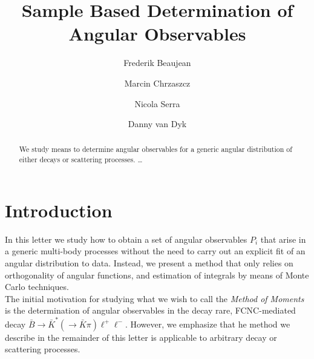 \documentclass[aps,prd,reprint,nofootinbib,preprintnumbers]{revtex4}
\begin{document}
\allowdisplaybreaks

\title{Sample Based Determination of Angular Observables}
\author{Frederik Beaujean}
\author{Marcin Chrzaszcz}
\author{Nicola Serra}
\author{Danny van Dyk}

\begin{abstract}
We study means to determine angular observables for a generic angular distribution
of either decays or scattering processes. \dots
\end{abstract}

\maketitle

\section{Introduction}
\label{sec:intro}

In this letter we study how to obtain a set of angular observables $P_i$
that arise in a generic multi-body processes without the need to carry out
an explicit fit of an angular distribution to data. Instead, we present a method
that only relies on orthogonality of angular functions, and estimation of integrals
by means of Monte Carlo techniques.\\

The initial motivation for studying what we wish to call the \emph{Method of Moments}
is the determination of angular observables in the decay rare, FCNC-mediated decay
$\bar{B}\to \bar{K}^*(\to \bar{K}\pi)\ell^+\ell^-$. However, we emphasize that
he method we describe in the remainder of this letter is applicable to arbitrary
decay or scattering processes.\\
\end{document}
